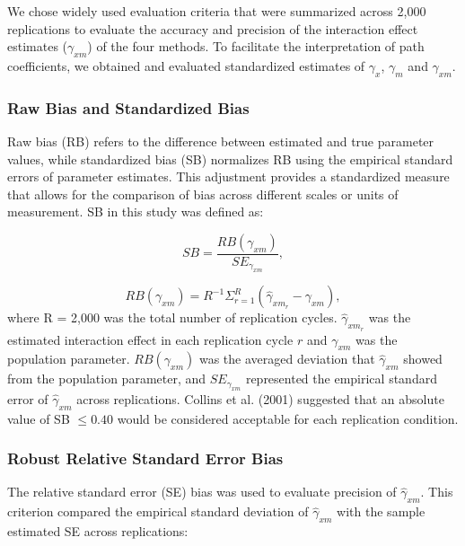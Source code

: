 \documentclass[
  man]{apa6}
\begin{document}
We chose widely used evaluation criteria that were summarized across 2,000 replications to evaluate the accuracy and precision of the interaction effect estimates (\(\gamma_{xm}\)) of the four methods. To facilitate the interpretation of path coefficients, we obtained and evaluated standardized estimates of \(\gamma_{x}\), \(\gamma_{m}\) and \(\gamma_{xm}\).

\subsubsection{Raw Bias and Standardized Bias}\label{raw-bias-and-standardized-bias}

Raw bias (RB) refers to the difference between estimated and true parameter values, while standardized bias (SB) normalizes RB using the empirical standard errors of parameter estimates. This adjustment provides a standardized measure that allows for the comparison of bias across different scales or units of measurement. SB in this study was defined as:

\begin{equation}
SB = \frac{RB(\gamma_{xm})}{SE_{\gamma_{xm}}},
\end{equation}

\begin{equation}
RB(\gamma_{xm}) = R^{-1}\Sigma^{R}_{r = 1}(\hat{\gamma}_{xm_{r}} - \gamma_{xm}),
\end{equation}
where R = 2,000 was the total number of replication cycles. \(\hat{\gamma}_{xm_{r}}\) was the estimated interaction effect in each replication cycle \(r\) and \(\gamma_{xm}\) was the population parameter. \(RB(\gamma_{xm})\) was the averaged deviation that \(\hat{\gamma}_{xm}\) showed from the population parameter, and \(SE_{\gamma_{xm}}\) represented the empirical standard error of \(\hat{\gamma}_{xm}\) across replications. Collins et al. (2001) suggested that an absolute value of SB \(\le 0.40\) would be considered acceptable for each replication condition.

\subsubsection{Robust Relative Standard Error Bias}\label{robust-relative-standard-error-bias}

The relative standard error (SE) bias was used to evaluate precision of \(\hat{\gamma}_{xm}\). This criterion compared the empirical standard deviation of \(\hat{\gamma}_{xm}\) with the sample estimated SE across replications:
\end{document}
